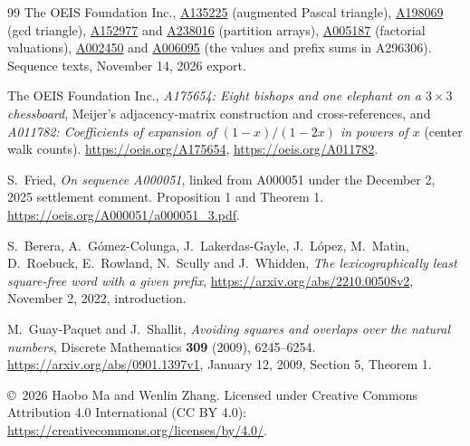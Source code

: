 \documentclass[11pt]{article}
\begin{document}
\begin{thebibliography}{99}
The OEIS Foundation Inc.,
\href{https://oeis.org/A135225}{A135225} (augmented Pascal triangle),
\href{https://oeis.org/A198069}{A198069} (gcd triangle),
\href{https://oeis.org/A152977}{A152977} and
\href{https://oeis.org/A238016}{A238016} (partition arrays),
\href{https://oeis.org/A005187}{A005187} (factorial valuations),
\href{https://oeis.org/A002450}{A002450} and
\href{https://oeis.org/A006095}{A006095} (the values and prefix sums
in A296306). Sequence texts, November 14, 2026 export.

The OEIS Foundation Inc., \emph{A175654: Eight bishops and one
elephant on a $3\times3$ chessboard}, Meijer's adjacency-matrix
construction and cross-references, and \emph{A011782: Coefficients
of expansion of $(1-x)/(1-2x)$ in powers of $x$} (center walk counts).
\url{https://oeis.org/A175654}, \url{https://oeis.org/A011782}.

S.~Fried, \emph{On sequence A000051}, linked from A000051 under
the December 2, 2025 settlement comment. Proposition 1 and Theorem 1.
\url{https://oeis.org/A000051/a000051_3.pdf}.

S.~Berera, A.~G\'omez-Colunga, J.~Lakerdas-Gayle, J.~L\'opez,
M.~Matin, D.~Roebuck, E.~Rowland, N.~Scully and J.~Whidden,
\emph{The lexicographically least square-free word with a given prefix},
\url{https://arxiv.org/abs/2210.00508v2}, November 2, 2022,
introduction.

M.~Guay-Paquet and J.~Shallit,
\emph{Avoiding squares and overlaps over the natural numbers},
Discrete Mathematics \textbf{309} (2009), 6245--6254.
\url{https://arxiv.org/abs/0901.1397v1}, January 12, 2009,
Section 5, Theorem 1.
\end{thebibliography}
\bigskip
\noindent\footnotesize
\copyright\ 2026 Haobo Ma and Wenlin Zhang.
Licensed under Creative Commons Attribution 4.0 International
(CC BY 4.0): \url{https://creativecommons.org/licenses/by/4.0/}.
\end{document}
